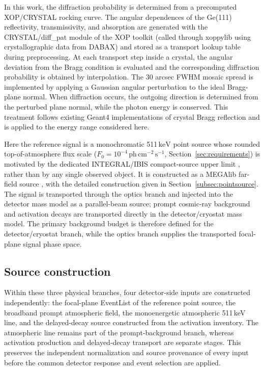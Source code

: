 \documentclass[11pt]{article}
\newcommand{\keV}{\ensuremath{\,\mathrm{keV}}}
\newcommand{\phcms}{\ensuremath{\,\mathrm{ph\,cm^{-2}\,s^{-1}}}}
\newcommand{\fzero}{F_{0}}
\begin{document}
In this work, the diffraction probability is determined from a precomputed XOP/CRYSTAL rocking curve. The angular dependences of the Ge(111) reflectivity, transmissivity, and absorption are generated with the CRYSTAL/diff\_pat module of the XOP toolkit (called through xoppylib using crystallographic data from DABAX) \cite{SanchezDelRio2011XOP} and stored as a transport lookup table during preprocessing. At each transport step inside a crystal, the angular deviation from the Bragg condition is evaluated and the corresponding diffraction probability is obtained by interpolation. The 30 arcsec FWHM mosaic spread is implemented by applying a Gaussian angular perturbation to the ideal Bragg-plane normal. When diffraction occurs, the outgoing direction is determined from the perturbed plane normal, while the photon energy is conserved. This treatment follows existing Geant4 implementations of crystal Bragg reflection \cite{Guan2023BraggReflection,Reiazi2025G4BraggReflection} and is applied to the energy range considered here.

Here the reference signal is a monochromatic 511\keV{} point source whose
rounded top-of-atmosphere flux scale
($\fzero=10^{-4}\phcms$, Section~\ref{sec:requirements}) is motivated by the
dedicated INTEGRAL/IBIS compact-source upper limit \cite{DeCesare2011}, rather
than by any single observed object. It is constructed as a MEGAlib far-field source
\cite{Zoglauer2006}, with the detailed construction given in
Section~\ref{subsec:pointsource}. The signal is transported through the optics
branch and injected into the detector mass model as a parallel-beam source;
prompt cosmic-ray background and activation decays are transported directly in
the detector/cryostat mass model. The primary background budget is therefore
defined for the detector/cryostat branch, while the optics branch supplies the
transported focal-plane signal phase space.

\subsection{Source construction}
\label{sec:background}

Within these three physical branches, four detector-side inputs are constructed
independently: the focal-plane EventList of the reference point source, the
broadband prompt atmospheric field, the monoenergetic atmospheric 511\,keV line,
and the delayed-decay source constructed from the activation inventory. The
atmospheric line remains part of the prompt-background branch, whereas
activation production and delayed-decay transport are separate stages. This
preserves the independent normalization and source provenance of every input
before the common detector response and event selection are applied.
\end{document}
